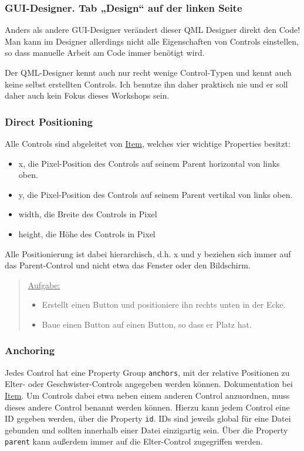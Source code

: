 \documentclass[a4paper]{article}
\begin{document}
\subsubsection{GUI-Designer. Tab „Design“ auf der linken Seite}
\label{sec-1-2-1}
Anders als andere GUI-Designer verändert dieser QML Designer direkt den Code! Man kann im Designer allerdings nicht alle Eigenschaften von Controls einstellen, so dass manuelle Arbeit am Code immer benötigt wird.

Der QML-Designer kennt auch nur recht wenige Control-Typen und kennt auch keine selbst erstellten Controls. Ich benutze ihn daher praktisch nie und er soll daher auch kein Fokus dieses Workshops sein.
\subsubsection{Direct Positioning}
\label{sec-1-2-2}
Alle Controls sind abgeleitet von \href{http://qt-project.org/doc/qt-5/qml-qtquick-item.html}{Item}, welches vier wichtige Properties besitzt:
\begin{itemize}
\item x, die Pixel-Position des Controls auf seinem Parent horizontal von links oben.
\item y, die Pixel-Position des Controls auf seinem Parent vertikal von links oben.
\item width, die Breite des Controls in Pixel
\item height, die Höhe des Controls in Pixel
\end{itemize}

Alle Positionierung ist dabei hierarchisch, d.h. x und y beziehen sich immer auf das Parent-Control und nicht etwa das Fenster oder den Bildschirm.

\begin{quote}
\uline{Aufgabe:}
\begin{itemize}
\item Erstellt einen Button und positioniere ihn rechts unten in der Ecke.
\item Baue einen Button auf einen Button, so dass er Platz hat.
\end{itemize}
\end{quote}
\subsubsection{Anchoring}
\label{sec-1-2-3}
Jedes Control hat eine Property Group \verb~anchors~, mit der relative Positionen zu Elter- oder Geschwister-Controls angegeben werden können. Dokumentation bei \href{http://qt-project.org/doc/qt-5/qml-qtquick-item.html}{Item}. Um Controls dabei etwa neben einem anderen Control anzuordnen, muss dieses andere Control benannt werden können. Hierzu kann jedem Control eine ID gegeben werden, über die Property \verb~id~. IDs sind jeweils global für eine Datei gebunden und sollten innerhalb einer Datei einzigartig sein.
Über die Property \verb~parent~ kann außerdem immer auf die Elter-Control zugegriffen werden.
\end{document}
